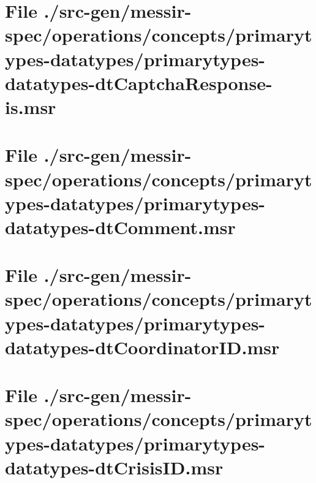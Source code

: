 \section[File /src-gen/messir-spec.../primarytypes-datatypes-dtCaptchaResponse-is.msr]{File ./src-gen/messir-spec/operations/concepts/primarytypes-datatypes/primarytypes-datatypes-dtCaptchaResponse-is.msr}
\scriptsize

\normalsize
	
\section[File /src-gen/messir-spec/operations.../primarytypes-datatypes-dtComment.msr]{File ./src-gen/messir-spec/operations/concepts/primarytypes-datatypes/primarytypes-datatypes-dtComment.msr}
\scriptsize

\normalsize
	
\section[File /src-gen/messir-spec.../primarytypes-datatypes-dtCoordinatorID.msr]{File ./src-gen/messir-spec/operations/concepts/primarytypes-datatypes/primarytypes-datatypes-dtCoordinatorID.msr}
\scriptsize

\normalsize
	
\section[File /src-gen/messir-spec/operations.../primarytypes-datatypes-dtCrisisID.msr]{File ./src-gen/messir-spec/operations/concepts/primarytypes-datatypes/primarytypes-datatypes-dtCrisisID.msr}
\scriptsize

\normalsize
	
